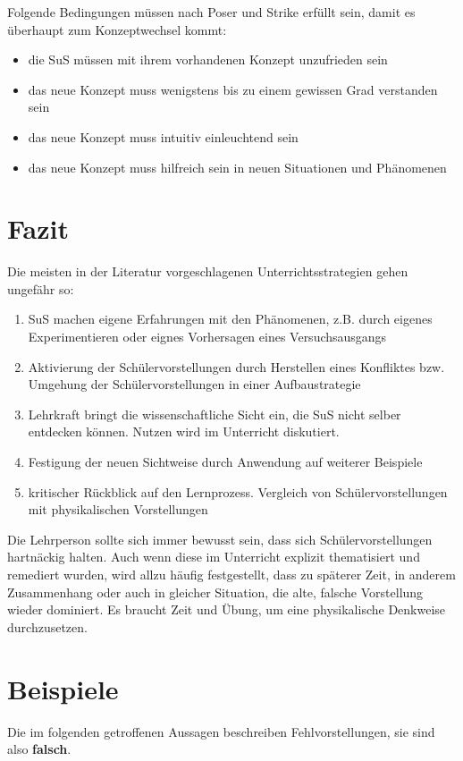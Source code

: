 Folgende Bedingungen m{\"u}ssen nach Poser und Strike erf{\"u}llt sein, damit es {\"u}berhaupt zum Konzeptwechsel kommt:

\begin{itemize}
\item die SuS m{\"u}ssen mit ihrem vorhandenen Konzept unzufrieden sein
\item das neue Konzept muss wenigstens bis zu einem gewissen Grad verstanden sein
\item das neue Konzept muss intuitiv einleuchtend sein
\item das neue Konzept muss hilfreich sein in neuen Situationen und Ph{\"a}nomenen
\end{itemize}

\bip\bip
\section{Fazit}
Die meisten in der Literatur vorgeschlagenen Unterrichtsstrategien gehen ungef{\"a}hr so:

\begin{enumerate}
\item 
SuS machen eigene Erfahrungen mit den Ph{\"a}nomenen, z.B. durch eigenes Experimentieren oder eignes Vorhersagen eines Versuchsausgangs
\item  
Aktivierung der Sch{\"u}lervorstellungen durch Herstellen eines Konfliktes bzw. Umgehung der Sch{\"u}lervorstellungen in einer Aufbaustrategie
\item
Lehrkraft bringt die wissenschaftliche Sicht ein, die SuS nicht selber entdecken k{\"o}nnen. Nutzen wird im Unterricht diskutiert.
\item
Festigung der neuen Sichtweise durch Anwendung auf weiterer Beispiele
\item
kritischer R{\"u}ckblick auf den Lernprozess. Vergleich von Sch{\"u}lervorstellungen mit physikalischen Vorstellungen
\end{enumerate}

Die Lehrperson sollte sich immer bewusst sein, dass sich Sch\"{u}lervorstellungen hartn\"{a}ckig halten. Auch wenn diese im Unterricht explizit thematisiert und remediert wurden, wird allzu h\"{a}ufig festgestellt, dass zu sp\"{a}terer Zeit, in anderem Zusammenhang oder auch in gleicher Situation, die alte, falsche Vorstellung wieder dominiert. Es braucht Zeit und \"{U}bung, um eine physikalische Denkweise durchzusetzen.

\bip\bip
\section{Beispiele}
Die im folgenden getroffenen Aussagen beschreiben
Fehlvorstellungen, sie sind also {\bf falsch}.

